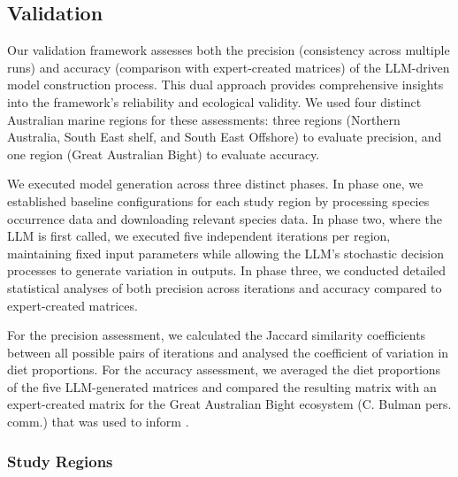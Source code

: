 \subsection{Validation}

Our validation framework assesses both the precision (consistency across multiple runs) and accuracy (comparison with expert-created matrices) of the LLM-driven model construction process. This dual approach provides comprehensive insights into the framework's reliability and ecological validity. We used four distinct Australian marine regions for these assessments: three regions (Northern Australia, South East shelf, and South East Offshore) to evaluate precision, and one region (Great Australian Bight) to evaluate accuracy.

We executed model generation across three distinct phases. In phase one, we established baseline configurations for each study region by processing species occurrence data and downloading relevant species data. In phase two, where the LLM is first called, we executed five independent iterations per region, maintaining fixed input parameters while allowing the LLM's stochastic decision processes to generate variation in outputs. In phase three, we conducted detailed statistical analyses of both precision across iterations and accuracy compared to expert-created matrices.

For the precision assessment, we calculated the Jaccard similarity coefficients between all possible pairs of iterations and analysed the coefficient of variation in diet proportions. For the accuracy assessment, we averaged the diet proportions of the five LLM-generated matrices and compared the resulting matrix with an expert-created matrix for the Great Australian Bight ecosystem (C. Bulman pers. comm.) that was used to inform \citep{Fulton2018}.

\subsubsection{Study Regions}

